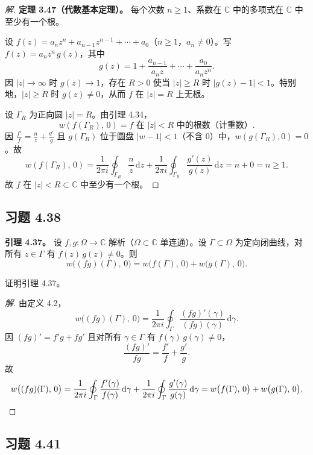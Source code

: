 \documentclass[11pt,a4paper]{article}
\newcommand{\C}{\mathbb{C}}
\newcommand{\dd}{\mathrm{d}}
\theoremstyle{definition}
\newenvironment{solution}{\begin{proof}[解]}{\end{proof}}
\begin{document}
\begin{solution}
  \textbf{定理 3.47（代数基本定理）。}
  每个次数 $n \ge 1$、系数在 $\C$ 中的多项式在 $\C$ 中至少有一个根。

  \medskip

  设 $f(z) = a_n z^n + a_{n-1}z^{n-1} + \cdots + a_0$（$n \ge 1$，$a_n \ne 0$）。写 $f(z) = a_n z^n\,g(z)$，其中
  \[
    g(z) = 1 + \frac{a_{n-1}}{a_n z} + \cdots + \frac{a_0}{a_n z^n}.
  \]
  因 $|z| \to \infty$ 时 $g(z) \to 1$，存在 $R > 0$ 使当 $|z| \ge R$ 时 $|g(z) - 1| < 1$。特别地，$|z| \ge R$ 时 $g(z) \ne 0$，从而 $f$ 在 $|z| = R$ 上无根。

  设 $\Gamma_R$ 为正向圆 $|z| = R$。由引理 4.34，
  \[
    w(f(\Gamma_R),\, 0)
    = f \text{ 在 } |z| < R \text{ 中的根数（计重数）}.
  \]
  因 $\frac{f'}{f} = \frac{n}{z} + \frac{g'}{g}$ 且 $g(\Gamma_R)$ 位于圆盘 $|w - 1| < 1$（不含 $0$）中，$w(g(\Gamma_R), 0) = 0$。故
  \[
    w(f(\Gamma_R),\, 0)
    = \frac{1}{2\pi i}\oint_{\Gamma_R}\!\frac{n}{z}\,\dd z
    + \frac{1}{2\pi i}\oint_{\Gamma_R}\!\frac{g'(z)}{g(z)}\,\dd z
    = n + 0 = n \ge 1.
  \]
  故 $f$ 在 $|z| < R \subset \C$ 中至少有一个根。\qedhere
\end{solution}

\subsection{习题 4.38}

\textbf{引理 4.37。}
设 $f, g : \Omega \to \C$ 解析（$\Omega \subset \C$ 单连通）。设 $\Gamma \subset \Omega$ 为定向闭曲线，对所有 $z \in \Gamma$ 有 $f(z)\,g(z) \ne 0$。则
\[
  w\bigl((fg)(\Gamma),\, 0\bigr)
  = w\bigl(f(\Gamma),\, 0\bigr)
  + w\bigl(g(\Gamma),\, 0\bigr).
\]

证明引理 4.37。

\begin{solution}
  由定义 4.2，
  \[
    w\bigl((fg)(\Gamma),\, 0\bigr)
    = \frac{1}{2\pi i}\oint_\Gamma
      \frac{(fg)'(\gamma)}{(fg)(\gamma)}\,\dd\gamma.
  \]
  因 $(fg)' = f'g + fg'$ 且对所有 $\gamma \in \Gamma$ 有 $f(\gamma)\,g(\gamma) \ne 0$，
  \[
    \frac{(fg)'}{fg} = \frac{f'}{f} + \frac{g'}{g}.
  \]
  故
  \[
    w\bigl((fg)(\Gamma),\, 0\bigr)
    = \frac{1}{2\pi i}\oint_\Gamma \frac{f'(\gamma)}{f(\gamma)}\,\dd\gamma
    + \frac{1}{2\pi i}\oint_\Gamma \frac{g'(\gamma)}{g(\gamma)}\,\dd\gamma
    = w\bigl(f(\Gamma),\, 0\bigr) + w\bigl(g(\Gamma),\, 0\bigr).\qedhere
  \]
\end{solution}

\subsection{习题 4.41}
\end{document}
